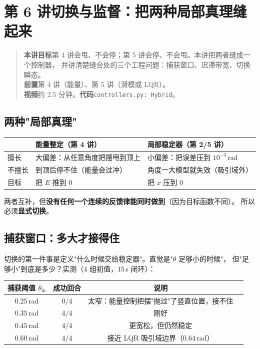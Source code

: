 \chapter[切换与监督]{第 6 讲\quad 切换与监督：把两种局部真理缝起来}
\label{ch:switch}

\begin{quote}\small
\textbf{本讲目标}\quad 第 4 讲会甩、不会停；第 5 讲会停、不会甩。本讲把两者缝成一个控制器，
并讲清楚缝合处的三个工程问题：捕获窗口、迟滞带宽、切换瞬态。\\[2pt]
\textbf{前置}\quad 第 4 讲（能量）、第 5 讲（滑模或 LQR）。\\
\textbf{视频}\quad 约 2.5 分钟。\quad\textbf{代码}\quad \texttt{controllers.py: Hybrid}。
\end{quote}

\section{两种"局部真理"}

\begin{center}
\small
\begin{tabular}{@{}lll@{}}
\toprule
 & 能量整定（第 4 讲） & 局部稳定器（第 2/5 讲）\\
\midrule
擅长 & 大偏差：从任意角度把摆甩到顶上 & 小偏差：把误差压到 $10^{-3}$\,rad \\
不擅长 & 到顶后停不住（能量会过冲） & 角度一大模型就失效（吸引域外）\\
目标 & 把 $E$ 推到 $0$ & 把 $x$ 压到 $0$ \\
\bottomrule
\end{tabular}
\end{center}

两者互补，但\textbf{没有任何一个连续的反馈律能同时做到}（因为目标函数不同）。
所以必须\textbf{显式切换}。

\section{捕获窗口：多大才接得住}

切换的第一件事是定义"什么时候交给稳定器"。直觉是"$\theta$ 足够小的时候"，
但"足够小"到底是多少？实测（4 组初值，$15$\,s 闭环）：

\begin{center}
\small
\begin{tabular}{@{}cccc@{}}
\toprule
捕获阈值 $\theta_{\mathrm{in}}$ & 成功回合 & 说明 \\
\midrule
$0.25$\,rad & $0/4$ & 太窄：能量控制把摆"抛过"了竖直位置，接不住 \\
$0.35$\,rad & $4/4$ & 刚好 \\
$0.45$\,rad & $4/4$ & 更宽松，但仍然稳定 \\
$0.60$\,rad & $4/4$ & 接近 LQR 吸引域边界（$0.64$\,rad） \\
\bottomrule
\end{tabular}
\end{center}


